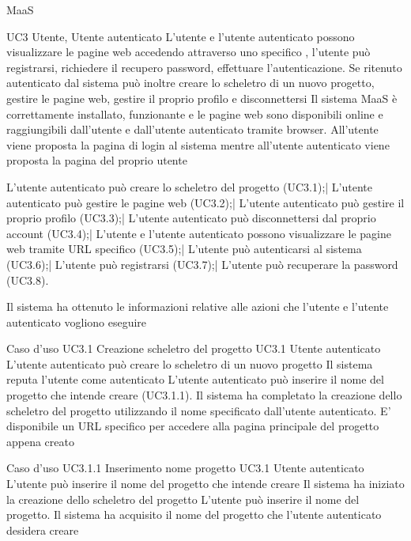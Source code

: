 
{MaaS}

\UC
{UC3}
{Utente, Utente autenticato}
{L'utente e l'utente autenticato possono visualizzare le pagine web accedendo attraverso uno specifico , l'utente può registrarsi, richiedere il recupero password, effettuare l'autenticazione. Se ritenuto autenticato dal sistema può inoltre creare lo scheletro di un nuovo progetto, gestire le pagine web, gestire il proprio profilo e disconnettersi}
{Il sistema MaaS è correttamente installato, funzionante e le pagine web sono disponibili online e raggiungibili dall'utente e dall'utente autenticato tramite browser. All'utente viene proposta la pagina di login al sistema mentre all'utente autenticato viene proposta la pagina del proprio  utente}

\scenario
{L'utente autenticato può creare lo scheletro del progetto (UC3.1);|
L'utente autenticato può  gestire le pagine web (UC3.2);|
L'utente autenticato può  gestire il proprio profilo (UC3.3);|
L'utente autenticato può  disconnettersi dal proprio account (UC3.4);|
L'utente e l'utente autenticato possono visualizzare le pagine web tramite URL specifico (UC3.5);|
L'utente può autenticarsi al sistema (UC3.6);|
L'utente può registrarsi (UC3.7);|
L'utente può recuperare la password (UC3.8).
}

\post
{Il sistema ha ottenuto le informazioni relative alle azioni che l'utente e l'utente autenticato vogliono eseguire}


\UCtitle
{Caso d'uso UC3.1}
{Creazione scheletro del progetto}
\UC
{UC3.1}
{Utente autenticato}
{L'utente autenticato può creare lo scheletro di un nuovo progetto}
{Il sistema reputa l'utente come autenticato}
\scenario
{L'utente autenticato può inserire il nome del progetto che intende creare (UC3.1.1).}
\post
{Il sistema ha completato la creazione dello scheletro del progetto utilizzando il nome specificato dall'utente autenticato. E' disponibile un URL specifico per accedere alla pagina principale del progetto appena creato}

\UCtitle
{Caso d'uso UC3.1.1}
{Inserimento nome progetto}
\UC
{UC3.1}
{Utente autenticato}
{L'utente può inserire il nome del progetto che intende creare}
{Il sistema ha iniziato la creazione dello scheletro del progetto}
\scenario
{L'utente può inserire il nome del progetto.}
\post
{Il sistema ha acquisito il nome del progetto che l'utente autenticato desidera creare}

